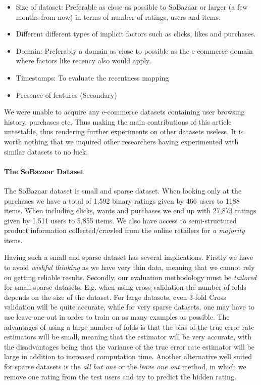 \begin{itemize}
	\item Size of dataset: Preferable as close as possible to SoBazaar or larger (a few months from now)
	in terms of number of ratings, users and items.
	\item Different different types of implicit factors	such as clicks, likes and purchases.
	\item Domain: Preferably a domain as close to possible as the e-commerce domain where
	factors like recency also would apply.
	\item Timestamps: To evaluate the recentness mapping
	\item Presence of features (Secondary)
\end{itemize}

We were unable to acquire any e-commerce datasets containing user browsing history, purchases etc.
Thus making the main contributions of this article untestable, thus rendering further experiments
on other datasets useless. It is worth nothing that we inquired other researchers having
experimented with similar datasets to no luck.

\paragraph{The SoBazaar Dataset}

The SoBazaar dataset is small and sparse dataset. When looking only at the purchases
we have a total of 1,592 binary ratings given by 466 users to 1188 items. When including
clicks, wants and purchases we end up with 27,873 ratings given by 1,511 users to 5,855 items.
We also have access to semi-structured product information collected/crawled from
the online retailers for \emph{a majority} items.

Having such a small and sparse dataset has several implications. Firstly we have
to avoid \emph{wishful thinking} as we have very thin data, meaning that we cannot
rely on getting reliable results. Secondly, our evaluation methodology must be
\emph{tailored} for small sparse datasets. E.g. when using cross-validation the number
of folds depends on the size of the dataset. For large datasets, even 3-fold Cross
validation will be quite accurate, while for very sparse datasets, one may have to
use leave-one-out in order to train on as many examples as possible. The advantages
of using a large number of folds is that the bias of the true error rate estimators
will be small, meaning that the estimator will be very accurate, with the disadvantages being that
the variance of the true error rate estimator will be large in addition to increased
computation time. Another alternative well suited for sparse datasets is the \emph{all but one} or the
\emph{leave one out} method, in which we remove one rating from the test users
and try to predict the hidden rating.

